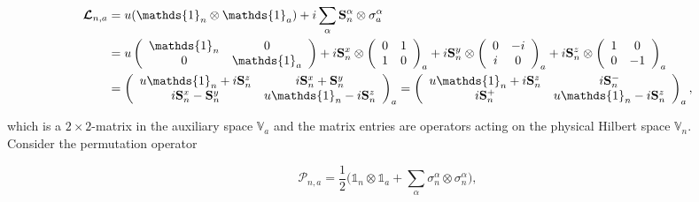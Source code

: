\documentclass{homework}
\begin{document}
\begin{equation}
    \begin{split}
    \bm{\mathcal{L}}_{n, a} &= u(\mathds{1}_n \otimes \mathds{1}_a) + i \sum_{\alpha} \spin_n^\alpha \otimes \sigma_{a}^\alpha \\
    &= u \left(\begin{array}{cc}
        \mathds{1}_n & 0  \\
        0 & \mathds{1}_a 
    \end{array}\right) + i \spin^{x}_{n} \otimes \left(\begin{array}{cc}
        0 & 1 \\
        1 & 0
    \end{array}\right)_a + i \spin^{y}_{n} \otimes \left(\begin{array}{cc}
        0 & -i \\
        i & 0 
    \end{array}\right)_a + i \spin^{z}_{n} \otimes \left(\begin{array}{cc}
        1 & 0  \\
        0 & -1
    \end{array}\right)_a \\
    &= \left(\begin{array}{cc}
       u \mathds{1}_n + i \spin^{z}_{n} & i \spin^{x}_{n} + \spin^{y}_{n} \\
       i \spin^{x}_{n} - \spin^{y}_{n}  & u \mathds{1}_n - i \spin^{z}_{n}
    \end{array}\right)_a = \left(\begin{array}{cc}
       u \mathds{1}_n + i \spin^{z}_{n} & i \spin^{-}_{n} \\
       i \spin^{+}_{n} & u \mathds{1}_n - i \spin^{z}_{n}
    \end{array}\right)_a,
    \end{split}
\end{equation}
    
which is a $2 \times 2$-matrix in the auxiliary space $\mathds{V}_a$ and the matrix entries are operators acting on the physical Hilbert space $\mathds{V}_n$. \\

Consider the permutation operator

\begin{equation}
    \bm{\mathcal P}_{n,a} = \frac{1}{2} \bigg(\mathds{1}_n \otimes \mathds{1}_a + \sum_{\alpha}\sigma_n^{\alpha}  \otimes \sigma_n^{\alpha} \bigg),
    \label{permutation op}
\end{equation}
\end{document}
